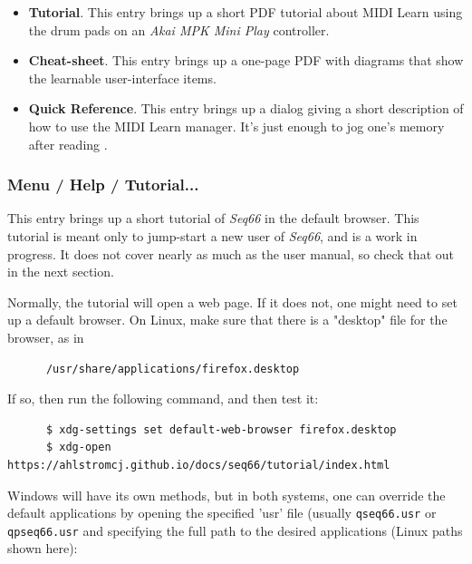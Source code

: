    \begin{itemize}
      \item \textbf{Tutorial}.
         This entry brings up a short PDF tutorial about MIDI Learn
         using the drum pads on an
         \textsl{Akai MPK Mini Play} controller.
      \item \textbf{Cheat-sheet}.
         This entry brings up a one-page PDF with diagrams that
         show the learnable user-interface items.
      \item \textbf{Quick Reference}.
         This entry brings up a dialog giving a short description of how to use
         the MIDI Learn manager.  It's just enough to jog one's memory after
         reading .
   \end{itemize}


\subsubsection{Menu / Help / Tutorial...}
\label{subsubsec:menu_help_tutorial}

   This entry brings up a short tutorial of \textsl{Seq66} in the default
   browser. This tutorial is meant only to jump-start a new user of
   \textsl{Seq66}, and is a work in progress.
   It does not cover nearly as much as the user manual, so check that out in
   the next section.

   Normally, the tutorial will open a web page.  If it does not, one might need
   to set up a default browser.  On Linux, make sure that there is a "desktop"
   file for the browser, as in


   \begin{verbatim}
      /usr/share/applications/firefox.desktop
   \end{verbatim}

   If so, then run the following command, and then test it:

   \begin{verbatim}
      $ xdg-settings set default-web-browser firefox.desktop
      $ xdg-open https://ahlstromcj.github.io/docs/seq66/tutorial/index.html 
   \end{verbatim}

   Windows will have its own methods, but
   in both systems, one can override the default applications by opening
   the specified 'usr' file (usually \texttt{qseq66.usr} or
   \texttt{qpseq66.usr} and specifying the full path to the desired
   applications (Linux paths shown here):

